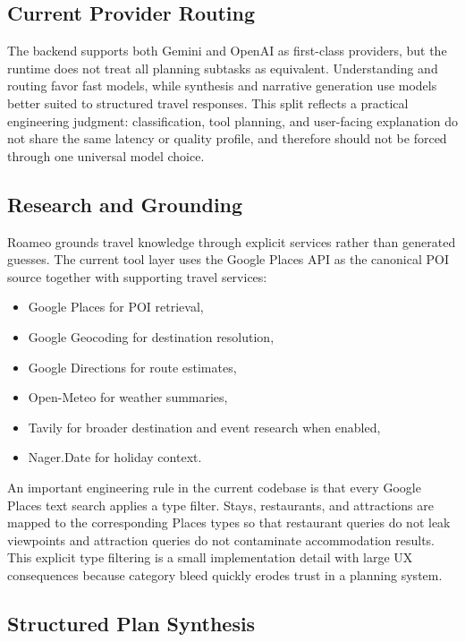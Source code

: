 \documentclass[conference]{IEEEtran}
\begin{document}
\subsection{Current Provider Routing}

The backend supports both Gemini and OpenAI as first-class providers, but the runtime does not treat all planning subtasks as equivalent. Understanding and routing favor fast models, while synthesis and narrative generation use models better suited to structured travel responses. This split reflects a practical engineering judgment: classification, tool planning, and user-facing explanation do not share the same latency or quality profile, and therefore should not be forced through one universal model choice.

\subsection{Research and Grounding}

Roameo grounds travel knowledge through explicit services rather than generated guesses. The current tool layer uses the Google Places API as the canonical POI source \cite{googleplaces2024} together with supporting travel services:

\begin{itemize}
  \item Google Places for POI retrieval,
  \item Google Geocoding for destination resolution,
  \item Google Directions for route estimates,
  \item Open-Meteo for weather summaries,
  \item Tavily for broader destination and event research when enabled,
  \item Nager.Date for holiday context.
\end{itemize}

An important engineering rule in the current codebase is that every Google Places text search applies a type filter. Stays, restaurants, and attractions are mapped to the corresponding Places types so that restaurant queries do not leak viewpoints and attraction queries do not contaminate accommodation results. This explicit type filtering is a small implementation detail with large UX consequences because category bleed quickly erodes trust in a planning system.

\subsection{Structured Plan Synthesis}
\end{document}
